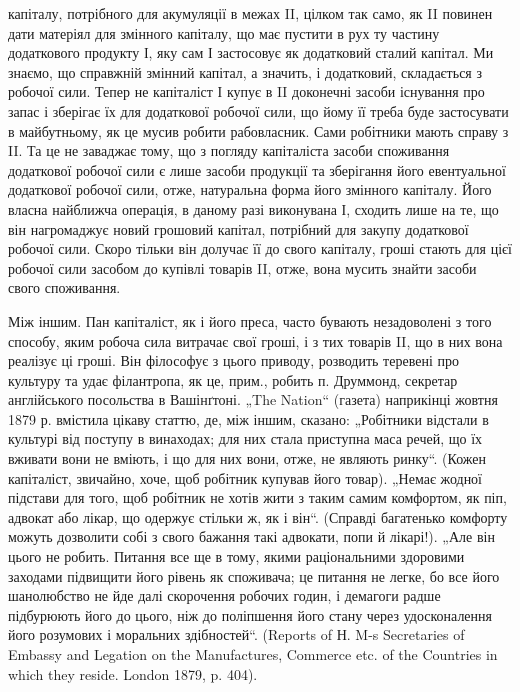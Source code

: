 \parcont{}  %
капіталу, потрібного для акумуляції в межах II, цілком так само, як II
повинен дати матеріял для змінного капіталу, що має пустити в рух ту
частину додаткового продукту І, яку сам І застосовує як додатковий
сталий капітал. Ми знаємо, що справжній змінний капітал, а значить, і
додатковий, складається з робочої сили. Тепер не капіталіст І купує в II
доконечні засоби існування про запас і зберігає їх для додаткової робочої
сили, що йому її треба буде застосувати в майбутньому, як це
мусив робити рабовласник. Сами робітники мають справу з II. Та це не
заваджає тому, що з погляду капіталіста засоби споживання додаткової
робочої сили є лише засоби продукції та зберігання його евентуальної
додаткової робочої сили, отже, натуральна форма його змінного капіталу.
Його власна найближча операція, в даному разі виконувана І, сходить
лише на те, що він нагромаджує новий грошовий капітал, потрібний для
закупу додаткової робочої сили. Скоро тільки він долучає її до свого
капіталу, гроші стають для цієї робочої сили засобом до купівлі
товарів II, отже, вона мусить знайти засоби свого споживання.

Між іншим. Пан капіталіст, як і його преса, часто бувають незадоволені
з того способу, яким робоча сила витрачає свої гроші, і з
тих товарів II, що в них вона реалізує ці гроші. Він філософує з цього
приводу, розводить теревені про культуру та удає філантропа, як це,
прим., робить п. Друммонд, секретар англійського посольства в Вашінґтоні.
„The Nation“ (газета) наприкінці жовтня 1879 р. вмістила цікаву
статтю, де, між іншим, сказано: „Робітники відстали в культурі від поступу
в винаходах; для них стала приступна маса речей, що їх вживати
вони не вміють, і що для них вони, отже, не являють ринку“.
(Кожен капіталіст, звичайно, хоче, щоб робітник купував його товар).
„Немає жодної підстави для того, щоб робітник не хотів жити з таким
самим комфортом, як піп, адвокат або лікар, що одержує стільки ж, як
і він“. (Справді багатенько комфорту можуть дозволити собі з свого бажання
такі адвокати, попи й лікарі!). „Але він цього не робить. Питання
все ще в тому, якими раціональними здоровими заходами підвищити його
рівень як споживача; це питання не легке, бо все його шанолюбство не
йде далі скорочення робочих годин, і демагоги радше підбурюють його
до цього, ніж до поліпшення його стану через удосконалення його розумових
і моральних здібностей“. (Reports of Н. M-s Secretaries of Embassy
and Legation on the Manufactures, Commerce etc. of the Countries in
which they reside. London 1879, p. 404).

